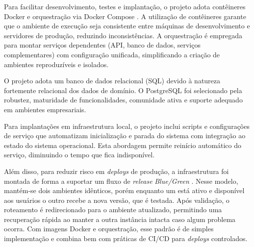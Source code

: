 \documentclass[
	article,
	12pt,				%
	oneside,
	a4paper,			%
	english,			%
	brazil				%
	]{abntex2}
\let\cite\citeonline
\begin{document}
Para facilitar desenvolvimento, testes e implantação, o projeto adota
contêineres Docker \cite{docker} e orquestração via Docker Compose
\cite{dockercompose}. A utilização de contêineres garante que o ambiente de
execução seja consistente entre máquinas de desenvolvimento e servidores de
produção, reduzindo inconsistências. A orquestração é empregada para montar
serviços dependentes (API, banco de dados, serviços complementares) com
configuração unificada, simplificando a criação de ambientes reproduzíveis e
isolados.   

O projeto adota um banco de dados relacional (SQL) devido à natureza fortemente
relacional dos dados de domínio. O PostgreSQL foi selecionado pela robustez,
maturidade de funcionalidades, comunidade ativa e suporte adequado em ambientes
empresariais.

Para implantações em infraestrutura local, o projeto inclui scripts e
configurações de serviço que automatizam inicialização e parada do sistema com
integração ao estado do sistema operacional. Esta abordagem permite reinício
automático do serviço, diminuindo o tempo que fica indisponível.

Além disso, para reduzir risco em \textit{deploys} de produção, a
infraestrutura foi montada de forma a suportar um fluxo de \textit{release}
\textit{Blue/Green} \cite{fowler2010}. Nesse modelo, mantém-se dois ambientes
idênticos, porém enquanto um está ativo e disponível aos usuários o outro
recebe a nova versão, que é testada. Após validação, o roteamento é
redirecionado para o ambiente atualizado, permitindo uma recuperação rápida ao
manter a outra instância intacta caso algum problema ocorra. Com imagens Docker
e orquestração, esse padrão é de simples implementação e combina bem com
práticas de CI/CD para \textit{deploys} controlados.
\end{document}
